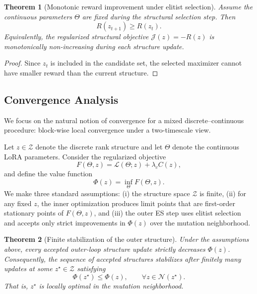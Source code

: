 \documentclass{article}
\newtheorem{theorem}{Theorem}
\begin{document}
\begin{theorem}[Monotonic reward improvement under elitist selection]
\label{thm:elitist_monotonicity}
Assume the continuous parameters $\Theta$ are fixed during the structural selection step. Then
\begin{equation}
    R(z_{t+1}) \ge R(z_t).
\end{equation}
Equivalently, the regularized structural objective $\mathcal{J}(z) = -R(z)$ is monotonically non-increasing during each structure update.
\end{theorem}

\begin{proof}
Since $z_t$ is included in the candidate set, the selected maximizer cannot have smaller reward than the current structure.
\end{proof}



\subsection{Convergence Analysis}
We focus on the natural notion of convergence for a mixed discrete--continuous procedure: block-wise local convergence under a two-timescale view.

Let $z \in \mathcal{Z}$ denote the discrete rank structure and let $\Theta$ denote the continuous LoRA parameters. Consider the regularized objective
\begin{equation}
    F(\Theta, z) = \mathcal{L}(\Theta; z) + \lambda_c C(z),
\end{equation}
and define the value function
\begin{equation}
    \Phi(z) = \inf_{\Theta} F(\Theta, z).
\end{equation}
We make three standard assumptions: (i) the structure space $\mathcal{Z}$ is finite, (ii) for any fixed $z$, the inner optimization produces limit points that are first-order stationary points of $F(\Theta,z)$, and (iii) the outer ES step uses elitist selection and accepts only strict improvements in $\Phi(z)$ over the mutation neighborhood.

\begin{theorem}[Finite stabilization of the outer structure]
\label{thm:outer_stabilization}
Under the assumptions above, every accepted outer-loop structure update strictly decreases $\Phi(z)$. Consequently, the sequence of accepted structures stabilizes after finitely many updates at some $z^\star \in \mathcal{Z}$ satisfying
\begin{equation}
    \Phi(z^\star) \le \Phi(z), \qquad \forall z \in \mathcal{N}(z^\star).
\end{equation}
That is, $z^\star$ is locally optimal in the mutation neighborhood.
\end{theorem}
\end{document}
